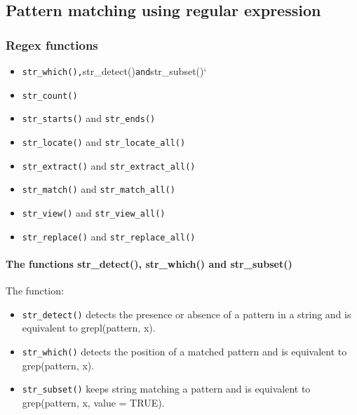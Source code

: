 \documentclass[
]{book}
\providecommand{\tightlist}{%
  \setlength{\itemsep}{0pt}\setlength{\parskip}{0pt}}
\begin{document}
\hypertarget{pattern-matching-using-regular-expression-1}{%
\subsection{Pattern matching using regular expression}\label{pattern-matching-using-regular-expression-1}}

\hypertarget{regex-functions-1}{%
\subsubsection{Regex functions}\label{regex-functions-1}}

\begin{itemize}
\tightlist
\item
  \texttt{str\_which(),}str\_detect()\texttt{and}str\_subset()`
\item
  \texttt{str\_count()}
\item
  \texttt{str\_starts()} and \texttt{str\_ends()}
\item
  \texttt{str\_locate()} and \texttt{str\_locate\_all()}
\item
  \texttt{str\_extract()} and \texttt{str\_extract\_all()}
\item
  \texttt{str\_match()} and \texttt{str\_match\_all()}
\item
  \texttt{str\_view()} and \texttt{str\_view\_all()}
\item
  \texttt{str\_replace()} and \texttt{str\_replace\_all()}
\end{itemize}

\hypertarget{the-functions-str_detect-str_which-and-str_subset}{%
\paragraph{The functions str\_detect(), str\_which() and str\_subset()}\label{the-functions-str_detect-str_which-and-str_subset}}

The function:

\begin{itemize}
\tightlist
\item
  \texttt{str\_detect()} detects the presence or absence of a pattern in a string and is equivalent to grepl(pattern, x).
\item
  \texttt{str\_which()} detects the position of a matched pattern and is equivalent to grep(pattern, x).
\item
  \texttt{str\_subset()} keeps string matching a pattern and is equivalent to grep(pattern, x, value = TRUE).
\end{itemize}
\end{document}
